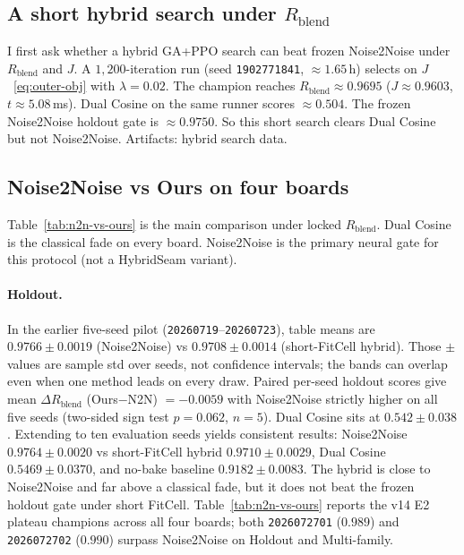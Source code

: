 \subsection{A short hybrid search under $R_{\mathrm{blend}}$}
\label{sec:v10-freeze}

I first ask whether a hybrid GA+PPO search can beat frozen Noise2Noise under $R_{\mathrm{blend}}$ and $J$.
A $1{,}200$-iteration run (seed \texttt{1902771841}, ${\approx}1.65$\,h) selects on $J$~\eqref{eq:outer-obj} with $\lambda{=}0.02$.
The champion reaches $R_{\mathrm{blend}}{\approx}0.9695$ ($J{\approx}0.9603$, $t{\approx}5.08$\,ms).
Dual Cosine on the same runner scores ${\approx}0.504$.
The frozen Noise2Noise holdout gate is ${\approx}0.9750$.
So this short search clears Dual Cosine but not Noise2Noise.
Artifacts:
hybrid search data.

\subsection{Noise2Noise vs Ours on four boards}
\label{sec:n2n-vs-ours-boards}

Table~\ref{tab:n2n-vs-ours} is the main comparison under locked $R_{\mathrm{blend}}$.
Dual Cosine is the classical fade on every board.
Noise2Noise is the primary neural gate for this protocol (not a HybridSeam variant).

\paragraph{Holdout.}
In the earlier five-seed pilot (\texttt{20260719}--\texttt{20260723}), table means are
$0.9766{\pm}0.0019$ (Noise2Noise) vs $0.9708{\pm}0.0014$ (short-FitCell hybrid).
Those $\pm$ values are sample std over seeds, not confidence intervals; the bands can overlap even when one method leads on every draw.
Paired per-seed holdout scores give mean $\Delta R_{\mathrm{blend}}$ (Ours$-$N2N) $={-}0.0059$ with Noise2Noise strictly higher on all five seeds (two-sided sign test $p{=}0.062$, $n{=}5$).
Dual Cosine sits at $0.542{\pm}0.038$.
Extending to ten evaluation seeds yields consistent results: Noise2Noise $0.9764{\pm}0.0020$ vs short-FitCell hybrid $0.9710{\pm}0.0029$, Dual Cosine $0.5469{\pm}0.0370$, and no-bake baseline $0.9182{\pm}0.0083$.
The hybrid is close to Noise2Noise and far above a classical fade, but it does not beat the frozen holdout gate under short FitCell. Table~\ref{tab:n2n-vs-ours} reports the v14 E2 plateau champions across all four boards; both \texttt{2026072701} ($0.989$) and \texttt{2026072702} ($0.990$) surpass Noise2Noise on Holdout and Multi-family.

